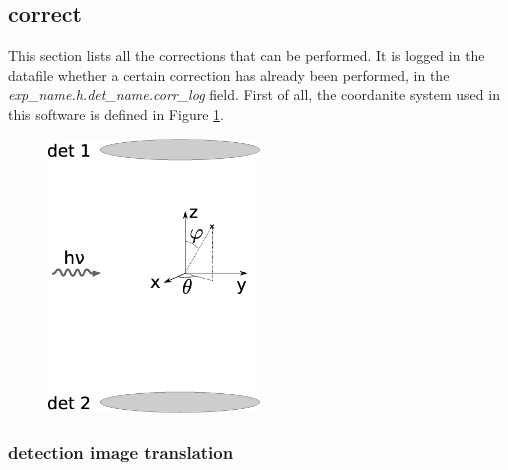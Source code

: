 \newpage
\subsection{correct}
This section lists all the corrections that can be performed. It is logged in the datafile whether a certain correction has already been performed, in the \emph{exp\_name.h.det\_name.corr\_log} field.
First of all, the coordanite system used in this software is defined in Figure \ref{coor_sys}.

\begin{figure}
  \centering
  \includegraphics[width=0.5\textwidth]{Graphics/coordinate_system.eps}
\label{coor_sys}
\end{figure}

\subsubsection{detection image translation}

